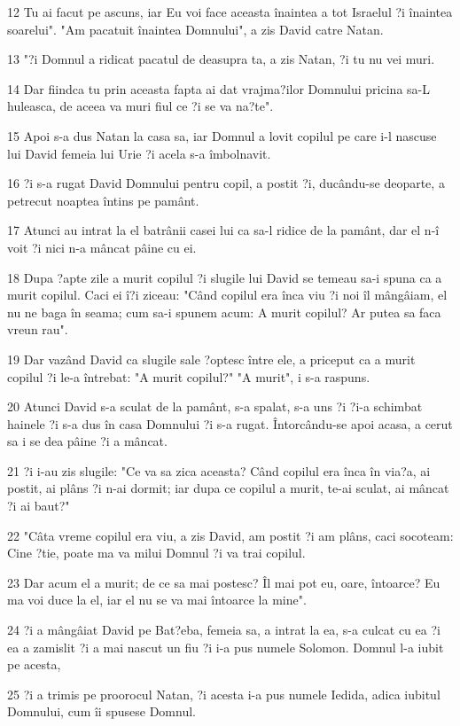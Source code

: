 \par 12 Tu ai facut pe ascuns, iar Eu voi face aceasta înaintea a tot Israelul ?i înaintea soarelui". "Am pacatuit înaintea Domnului", a zis David catre Natan.
\par 13 "?i Domnul a ridicat pacatul de deasupra ta, a zis Natan, ?i tu nu vei muri.
\par 14 Dar fiindca tu prin aceasta fapta ai dat vrajma?ilor Domnului pricina sa-L huleasca, de aceea va muri fiul ce ?i se va na?te".
\par 15 Apoi s-a dus Natan la casa sa, iar Domnul a lovit copilul pe care i-l nascuse lui David femeia lui Urie ?i acela s-a îmbolnavit.
\par 16 ?i s-a rugat David Domnului pentru copil, a postit ?i, ducându-se deoparte, a petrecut noaptea întins pe pamânt.
\par 17 Atunci au intrat la el batrânii casei lui ca sa-l ridice de la pamânt, dar el n-î voit ?i nici n-a mâncat pâine cu ei.
\par 18 Dupa ?apte zile a murit copilul ?i slugile lui David se temeau sa-i spuna ca a murit copilul. Caci ei î?i ziceau: "Când copilul era înca viu ?i noi îl mângâiam, el nu ne baga în seama; cum sa-i spunem acum: A murit copilul? Ar putea sa faca vreun rau".
\par 19 Dar vazând David ca slugile sale ?optesc între ele, a priceput ca a murit copilul ?i le-a întrebat: "A murit copilul?" "A murit", i s-a raspuns.
\par 20 Atunci David s-a sculat de la pamânt, s-a spalat, s-a uns ?i ?i-a schimbat hainele ?i s-a dus în casa Domnului ?i s-a rugat. Întorcându-se apoi acasa, a cerut sa i se dea pâine ?i a mâncat.
\par 21 ?i i-au zis slugile: "Ce va sa zica aceasta? Când copilul era înca în via?a, ai postit, ai plâns ?i n-ai dormit; iar dupa ce copilul a murit, te-ai sculat, ai mâncat ?i ai baut?"
\par 22 "Câta vreme copilul era viu, a zis David, am postit ?i am plâns, caci socoteam: Cine ?tie, poate ma va milui Domnul ?i va trai copilul.
\par 23 Dar acum el a murit; de ce sa mai postesc? Îl mai pot eu, oare, întoarce? Eu ma voi duce la el, iar el nu se va mai întoarce la mine".
\par 24 ?i a mângâiat David pe Bat?eba, femeia sa, a intrat la ea, s-a culcat cu ea ?i ea a zamislit ?i a mai nascut un fiu ?i i-a pus numele Solomon. Domnul l-a iubit pe acesta,
\par 25 ?i a trimis pe proorocul Natan, ?i acesta i-a pus numele Iedida, adica iubitul Domnului, cum îi spusese Domnul.
